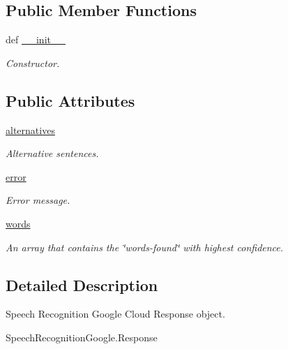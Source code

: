 \subsection*{Public Member Functions}
\begin{DoxyCompactItemize}
\item 
def \hyperlink{classRappCloud_1_1CloudMsgs_1_1SpeechRecognitionGoogle_1_1SpeechRecognitionGoogle_1_1Response_a7ce5732836d40c388ac735f29891c96a}{\-\_\-\-\_\-init\-\_\-\-\_\-}
\begin{DoxyCompactList}\small\item\em Constructor. \end{DoxyCompactList}\end{DoxyCompactItemize}
\subsection*{Public Attributes}
\begin{DoxyCompactItemize}
\item 
\hyperlink{classRappCloud_1_1CloudMsgs_1_1SpeechRecognitionGoogle_1_1SpeechRecognitionGoogle_1_1Response_ade7fad0b7524d84c3eeefc9767ea1d3d}{alternatives}
\begin{DoxyCompactList}\small\item\em Alternative sentences. \end{DoxyCompactList}\item 
\hyperlink{classRappCloud_1_1CloudMsgs_1_1SpeechRecognitionGoogle_1_1SpeechRecognitionGoogle_1_1Response_a6b32c2163c5a93ee915e6c4f4a261b8a}{error}
\begin{DoxyCompactList}\small\item\em Error message. \end{DoxyCompactList}\item 
\hyperlink{classRappCloud_1_1CloudMsgs_1_1SpeechRecognitionGoogle_1_1SpeechRecognitionGoogle_1_1Response_a7f6dc4528ad1627b1c59d1d59e64940d}{words}
\begin{DoxyCompactList}\small\item\em An array that contains the \char`\"{}words-\/found\char`\"{} with highest confidence. \end{DoxyCompactList}\end{DoxyCompactItemize}


\subsection{Detailed Description}
\begin{DoxyVerb}Speech Recognition Google Cloud Response object.

SpeechRecognitionGoogle.Response
\end{DoxyVerb}
 

